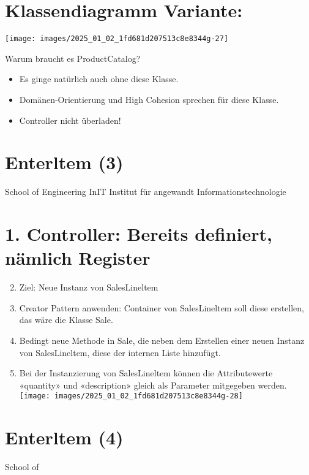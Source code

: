 \documentclass[10pt]{article}
\begin{document}
\section*{Klassendiagramm Variante:}
\begin{center}
\texttt{[image: images/2025\_01\_02\_1fd681d207513c8e8344g-27]}
\end{center}

Warum braucht es ProductCatalog?

\begin{itemize}
  \item Es ginge natürlich auch ohne diese Klasse.
  \item Domänen-Orientierung und High Cohesion sprechen für diese Klasse.
  \item Controller nicht überladen!
\end{itemize}

\section*{Enterltem (3)}
School of Engineering InIT Institut für angewandt Informationstechnologie

\section*{1. Controller: Bereits definiert, nämlich Register}
\begin{enumerate}
  \setcounter{enumi}{1}
  \item Ziel: Neue Instanz von SalesLineltem
  \item Creator Pattern anwenden: Container von SalesLineltem soll diese erstellen, das wäre die Klasse Sale.
  \item Bedingt neue Methode in Sale, die neben dem Erstellen einer neuen Instanz von SalesLineltem, diese der internen Liste hinzufügt.
  \item Bei der Instanzierung von SalesLineltem können die Attributewerte «quantity» und «description» gleich als Parameter mitgegeben werden.\\
\texttt{[image: images/2025\_01\_02\_1fd681d207513c8e8344g-28]}
\end{enumerate}

\section*{Enterltem (4)}
School of
\end{document}
